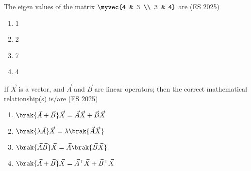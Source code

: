 \item The eigen values of the matrix $ \myvec{4 & 3 \\ 3 & 4}$ are \hfill (ES 2025)

\begin{multicols}{4}
\begin{enumerate}
\item 1
\item 2
\item 7
\item 4
\end{enumerate}
\end{multicols}

\item If $\vec{X}$ is a vector, and $\vec{A}$ and $\vec{B}$ are linear operators; then the correct mathematical relationship(s) is/are \hfill (ES 2025)
\begin{multicols}{2}
\begin{enumerate}
\item $\brak{\vec{A}+\vec{B}}\vec{X} = \vec{A}\vec{X} + \vec{B}\vec{X}$
\item $\brak{\lambda \vec{A}}\vec{X} = \lambda\brak{\vec{A}\vec{X}}$
\item $\brak{\vec{A}\vec{B}}\vec{X} = \vec{A}\brak{\vec{B}\vec{X}}$
\item $\brak{\vec{A}+\vec{B}}\vec{X} = \vec{A}^{\top}\vec{X} + \vec{B}^{\top}\vec{X}$
\end{enumerate}
\end{multicols}

